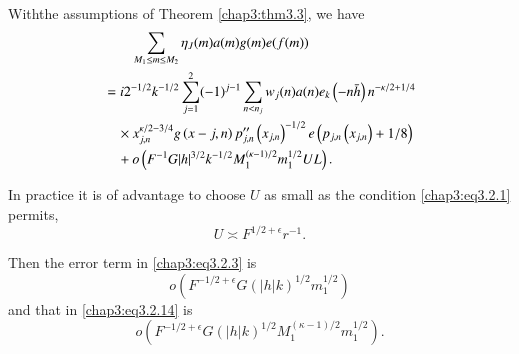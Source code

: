 \begin{thm}\label{chap3:thm3.4}
With\pageoriginale the assumptions of Theorem \ref{chap3:thm3.3}, we
have 
\begin{align}
&\qquad \sum\limits_{M_1\leq m\leq
M_2}\eta_J(m)a(m)g(m)e(f(m))\label{chap3:eq3.2.14}\\
&= i2^{-1/2}k^{-1/2}\sum\limits_{j=1}^2(-1)^{j-1}\sum\limits_{n<n_j}
w_j(n)a(n)e_k\left(-n\bar{h}\right)n^{-\kappa/2+1/4}\notag\\
&\quad \times x_{j,n}^{\kappa/2-3/4}g\left(x-{j,n}\right)p''_{j,n}
\left(x_{j,n}\right)^{-1/2}e\left(p_{j,n}\left(x_{j,n}\right)+1/8
\right)\notag\\
&\quad +o\left(F^{-1}G|h|^{3/2}k^{-1/2}M_1^{(\kappa-1)/2}m_1^{1/2}UL
\right).\notag 
\end{align}
\end{thm}

\begin{remark*}
In practice it is of advantage to choose $U$ as small as the condition
\eqref{chap3:eq3.2.1} permits, \ie
\begin{equation}\label{chap3:eq3.2.15}
U\asymp F^{1/2+\epsilon}r^{-1}.
\end{equation}

Then the error term in \eqref{chap3:eq3.2.3} is 
\begin{equation}\label{chap3:eq3.2.16}
o\left(F^{-1/2+\epsilon}G\left(|h|k\right)^{1/2}m_1^{1/2}\right)
\end{equation}
and that in \eqref{chap3:eq3.2.14} is 
\begin{equation}\label{chap3:eq3.2.17}
o\left(F^{-1/2+\epsilon}G\left(|h|k\right)^{1/2}M_1^{(\kappa-1)/2}
m_1^{1/2}\right). 
\end{equation}
\end{remark*}
